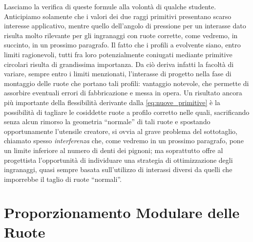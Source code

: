 \noindent Lasciamo la verifica di queste 
formule alla volont\`a di qualche studente.
Anticipiamo solamente che i valori dei due raggi primitivi
presentano scarso interesse applicativo, mentre quello dell'angolo di pressione
per un interasse dato risulta molto rilevante per gli ingranaggi con ruote
corrette, come vedremo, in succinto, in un prossimo paragrafo.
Il fatto che i profili a evolvente siano, entro limiti ragionevoli,
tutti fra loro potenzialmente coniugati mediante primitive circolari
risulta di grandissima importanza. Da ci\`o deriva infatti
la facolt\`a di variare, sempre entro i limiti menzionati,
 l'interasse di progetto
nella fase di montaggio delle ruote che portano tali profili:
vantaggio notevole, che permette di assorbire eventuali errori
di fabbricazione e messa in opera. Un risultato ancora pi\`u importante
della flessibilit\`a derivante dalla \ref{eq:nuove_primitive} \`e
la possibilit\`a di tagliare
le cosiddette ruote a profilo corretto nelle quali, sacrificando
senza alcun rimorso la geometria ``normale''  di tali ruote e spostando
opportunamente l'utensile creatore, si ovvia al grave problema del sottotaglio,
chiamato spesso {\em interferenza} che, come vedremo in un prossimo
paragrafo, pone un limite inferiore al numero di denti dei pignoni; ma
soprattutto offre al progettista l'opportunit\`a di individuare una strategia
di ottimizzazione degli ingranaggi, quasi sempre basata sull'utilizzo di
interassi diversi da quelli che imporrebbe il taglio di ruote ``normali''.


\section{Proporzionamento Modulare delle Ruote}

